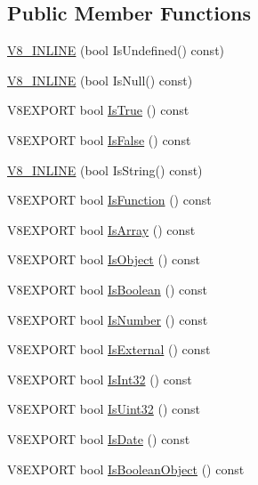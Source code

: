 \subsection*{Public Member Functions}
\begin{DoxyCompactItemize}
\item 
\hyperlink{classv8_1_1_value_ab7fe6f0f40ad56063af2b549d9c16938}{V8\+\_\+\+I\+N\+L\+I\+N\+E} (bool Is\+Undefined() const)
\item 
\hyperlink{classv8_1_1_value_a19bb214761816faf8b2784e4d78c9f21}{V8\+\_\+\+I\+N\+L\+I\+N\+E} (bool Is\+Null() const)
\item 
V8\+E\+X\+P\+O\+R\+T bool \hyperlink{classv8_1_1_value_ae93277798682f4be9adc204a16c40591}{Is\+True} () const 
\item 
V8\+E\+X\+P\+O\+R\+T bool \hyperlink{classv8_1_1_value_a265c208159ff3163ecda1e9f71b99115}{Is\+False} () const 
\item 
\hyperlink{classv8_1_1_value_a14bd69255a9fd04fa641713188814958}{V8\+\_\+\+I\+N\+L\+I\+N\+E} (bool Is\+String() const)
\item 
V8\+E\+X\+P\+O\+R\+T bool \hyperlink{classv8_1_1_value_a33f329c93a9f417e2d05b438e6e5429c}{Is\+Function} () const 
\item 
V8\+E\+X\+P\+O\+R\+T bool \hyperlink{classv8_1_1_value_a95c39ad189c09630dd90ee5c1a7e89a1}{Is\+Array} () const 
\item 
V8\+E\+X\+P\+O\+R\+T bool \hyperlink{classv8_1_1_value_a360f1fe4a8ee74382f571a12eb14a222}{Is\+Object} () const 
\item 
V8\+E\+X\+P\+O\+R\+T bool \hyperlink{classv8_1_1_value_a6baff625780eac51413f2392250e81be}{Is\+Boolean} () const 
\item 
V8\+E\+X\+P\+O\+R\+T bool \hyperlink{classv8_1_1_value_a32003b217768f535a4728bbd16ebd7d5}{Is\+Number} () const 
\item 
V8\+E\+X\+P\+O\+R\+T bool \hyperlink{classv8_1_1_value_a7aed90ede9bf48b10f18cdb97d50fd1e}{Is\+External} () const 
\item 
V8\+E\+X\+P\+O\+R\+T bool \hyperlink{classv8_1_1_value_a70d4afaccc7903e6a01f40a46ad04188}{Is\+Int32} () const 
\item 
V8\+E\+X\+P\+O\+R\+T bool \hyperlink{classv8_1_1_value_a2674a47b2550eb456a7ecfaf09d2f97e}{Is\+Uint32} () const 
\item 
V8\+E\+X\+P\+O\+R\+T bool \hyperlink{classv8_1_1_value_abcdd87539238a68f8337bae7d0a9c1ac}{Is\+Date} () const 
\item 
V8\+E\+X\+P\+O\+R\+T bool \hyperlink{classv8_1_1_value_aebb6cd7cbb34771df1973aef2e544931}{Is\+Boolean\+Object} () const 

\end{DoxyCompactItemize}
